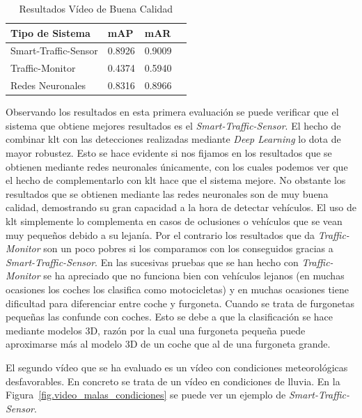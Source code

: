 \begin{table}[H] 
\begin{center}
\begin{tabular}{|l|l|l|l|}
\hline
Tipo de Sistema & mAP & mAR  \\ 
\hline \hline
Smart-Traffic-Sensor & 0.8926 & 0.9009 \\ \hline
Traffic-Monitor & 0.4374 & 0.5940 \\ \hline
Redes Neuronales & 0.8316 & 0.8966\\ \hline
\end{tabular}
\caption{Resultados Vídeo de Buena Calidad}
\label{resultados_video_bueno}
\end{center}
\end{table}

Observando los resultados en esta primera evaluación se puede verificar que el sistema que obtiene mejores resultados es el \textit{Smart-Traffic-Sensor}. El hecho de combinar \acrshort{klt} con las detecciones realizadas mediante \textit{Deep Learning} lo dota de mayor robustez. Esto se hace evidente si nos fijamos en los resultados que se obtienen mediante redes neuronales únicamente, con los cuales podemos ver que el hecho de complementarlo con \acrshort{klt} hace que el sistema mejore. No obstante los resultados que se obtienen mediante las redes neuronales son de muy buena calidad, demostrando su gran capacidad a la hora de detectar vehículos. El uso de \acrshort{klt} simplemente lo complementa en casos de oclusiones o vehículos que se vean muy pequeños debido a su lejanía. 
Por el contrario los resultados que da \textit{Traffic-Monitor} son un poco pobres si los comparamos con los conseguidos gracias a \textit{Smart-Traffic-Sensor}. En las sucesivas pruebas que se han hecho con \textit{Traffic-Monitor} se ha apreciado que no funciona bien con vehículos lejanos (en muchas ocasiones los coches los clasifica como motocicletas) y en muchas ocasiones tiene dificultad para diferenciar entre coche y furgoneta. Cuando se trata de furgonetas pequeñas las confunde con coches. Esto se debe a que la clasificación se hace mediante modelos 3D, razón por la cual una furgoneta pequeña puede aproximarse más al modelo 3D de un coche que al de una furgoneta grande.


El segundo vídeo que se ha evaluado es un vídeo con condiciones meteorológicas desfavorables. En concreto se trata de un vídeo en condiciones de lluvia. En la Figura~\ref{fig.video_malas_condiciones} se puede ver un ejemplo de \textit{Smart-Traffic-Sensor}.

